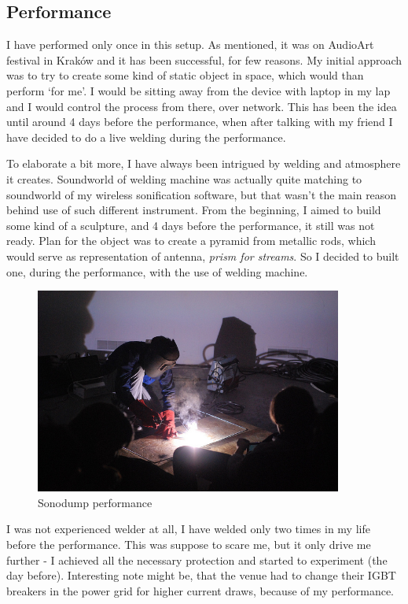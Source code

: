 \documentclass[12pt,a4paper,oneside]{report}
\begin{document}
\subsection{Performance}
I have performed only once in this setup. As mentioned, it was on AudioArt festival in Kraków and it has been successful, for few reasons. My initial approach was to try to create some kind of static object in space, which would than perform `for me'. I would be sitting away from the device with laptop in my lap and I would control the process from there, over network. This has been the idea until around 4 days before the performance, when after talking with my friend I have decided to do a live welding during the performance.

To elaborate a bit more, I have always been intrigued by welding and atmosphere it creates. Soundworld of welding machine was actually quite matching to soundworld of my wireless sonification software, but that wasn't the main reason behind use of such different instrument. From the beginning, I aimed to build some kind of a sculpture, and 4 days before the performance, it still was not ready. Plan for the object was to create a pyramid from metallic rods, which would serve as representation of antenna, \textit{prism for streams}. So I decided to built one, during the performance, with the use of welding machine.

\begin{figure}  
  \centering
    \includegraphics[width=0.9\textwidth]{img/zvarac}
	\caption{Sonodump performance}
	\label{fig:zvarac}
\end{figure}

I was not experienced welder at all, I have welded only two times in my life before the performance. This was suppose to scare me, but it only drive me further - I achieved all the necessary protection and started to experiment (the day before). Interesting note might be, that the venue had to change their IGBT breakers in the power grid for higher current draws, because of my performance.
\end{document}
